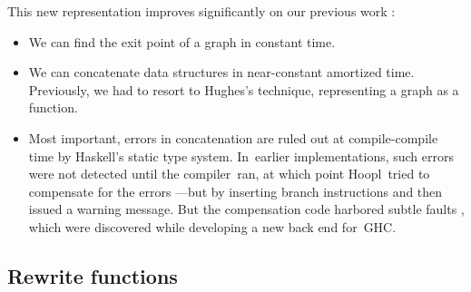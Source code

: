 \documentclass[blockstyle,preprint,natbib,nocopyrightspace]{sigplanconf}
\newcommand\ourlib{Hoopl}  %
\let\cite\citep
\def\authornote#1{\unskip\relax}
\newcommand{\simon}[1]{\authornote{SLPJ: #1}}
\newcommand\seclabel[1]{\label{sec:#1}}
\begin{document}
This new representation improves significantly on our previous work
\cite{ramsey-dias:applicative-flow-graph}:
\begin{itemize}
\item
We can find the exit point of a graph in constant time.
\item
We can concatenate data structures 
in near-constant amortized time.
Previously, we had to resort to Hughes's
\citeyearpar{hughes:lists-representation} technique, representing
a graph as a function.
\item
Most important, errors in concatenation are ruled out at
compile-compile time by Haskell's static
type system.
In~earlier implementations, such errors were not detected until
the compiler~ran, at which point \ourlib\ tried to compensate
for the errors%
\ifcutting---but
\else
by inserting branch instructions and then issued a warning message.
But
\fi
the compensation code harbored subtle faults%
\ifcutting\else, which were discovered while developing a new back end
for~GHC\fi. 
\end{itemize}








\subsection{Rewrite functions}
\seclabel{rewrite-functions}
\end{document}
